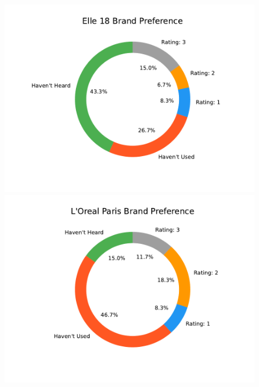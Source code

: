 \documentclass{article}
\begin{document}
\begin{figure}[htbp]
    \centering
    \includegraphics[scale=0.6]{../images/survey-graphs/Elle 18-brand-preference.pdf}
    \includegraphics[scale=0.6]{../images/survey-graphs/L'Oreal Paris-brand-preference.pdf}
\end{figure}
\end{document}
